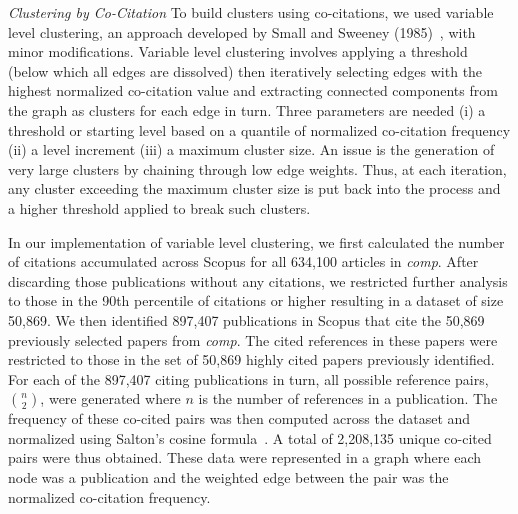 \emph{Clustering by Co-Citation} To build clusters using co-citations, we used variable level clustering, an approach developed by Small and Sweeney (1985)~\cite{small_clustering_1985}, with minor modifications. Variable level clustering involves applying a threshold (below which all edges are dissolved) then iteratively selecting edges with the highest normalized co-citation value and extracting connected components from the graph as clusters for each edge in turn. Three parameters are needed (i) a threshold or starting level based on a quantile of normalized co-citation frequency (ii) a level increment (iii) a maximum cluster size. An issue is the generation of very large clusters by chaining through low edge weights.  Thus, at each iteration, any cluster exceeding the maximum cluster size is put back into the process and a higher threshold applied to break such clusters.

In our implementation of variable level clustering, we first calculated the number of citations accumulated across Scopus for all 634,100 articles in \emph{comp}. After discarding those publications without any citations, we restricted further analysis to those in the 90th percentile of citations or higher resulting in a dataset of size 50,869. We then identified 897,407 publications in Scopus that cite the 50,869 previously selected papers from \emph{comp}. The cited references in these papers were restricted to those in the set of 50,869 highly cited papers previously identified. For each of the 897,407 citing publications in turn, all possible reference pairs, ${n \choose 2}$, were generated where $n$ is the number of references in a publication. The frequency of these co-cited pairs was then computed across the dataset  and normalized using Salton's cosine formula~\cite{salton_citation_1979}. A total of 2,208,135 unique co-cited pairs were thus obtained. These data were represented in a graph where each node was a publication and the weighted edge between the pair was the normalized co-citation frequency. \par

